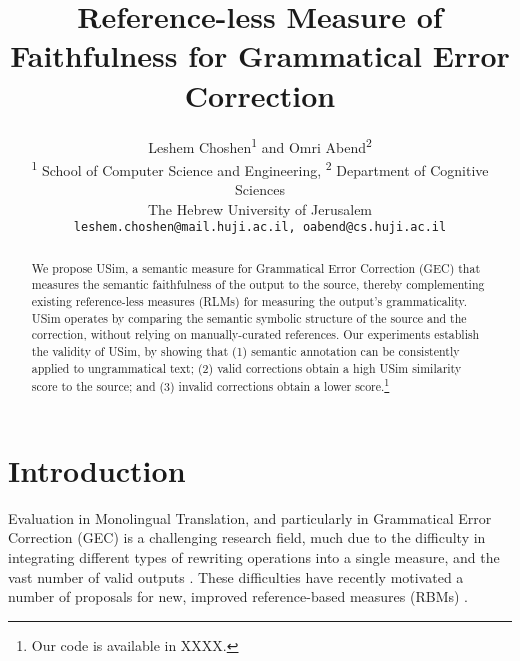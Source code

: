 \documentclass[a4paper, 11pt]{article}
\begin{document}
\title{Reference-less Measure of Faithfulness for Grammatical Error Correction}
\author{
  Leshem Choshen\textsuperscript{1} and Omri Abend\textsuperscript{2} \\
  \textsuperscript{1} School of Computer Science and Engineering,
  \textsuperscript{2} Department of Cognitive Sciences \\
  The Hebrew University of Jerusalem \\
  \texttt{leshem.choshen@mail.huji.ac.il, oabend@cs.huji.ac.il}\\
}
\maketitle

\begin{abstract}
  We propose {\sc USim}, a semantic measure for Grammatical Error Correction (GEC)
  that measures the semantic faithfulness of the output to the source,
  thereby complementing existing reference-less measures (RLMs) for measuring the output's grammaticality.
  {\sc USim} operates by comparing the semantic symbolic structure of the source and the correction,
	without relying on manually-curated references.
  Our experiments establish the validity of {\sc USim},
  by showing that (1) semantic annotation can be consistently applied to ungrammatical text; (2)
  valid corrections obtain a high {\sc USim} similarity score to the source; and (3)
  invalid corrections obtain a lower score.\footnote{Our code is available in {\color{red} XXXX}.}
\end{abstract}


\section{Introduction}

Evaluation in Monolingual Translation, and particularly in Grammatical Error Correction (GEC) is a challenging
research field, much due to the difficulty in integrating 
different types of rewriting operations into a single measure, and the vast number of valid outputs
\cite{tetreault2008native,madnani2011they,chodorow2012problems,bryant2015far}.
These difficulties have recently motivated
a number of proposals for new, improved reference-based measures (RBMs)  \cite{dahlmeier2012better,felice2015towards,napoles2015ground}.
\end{document}
